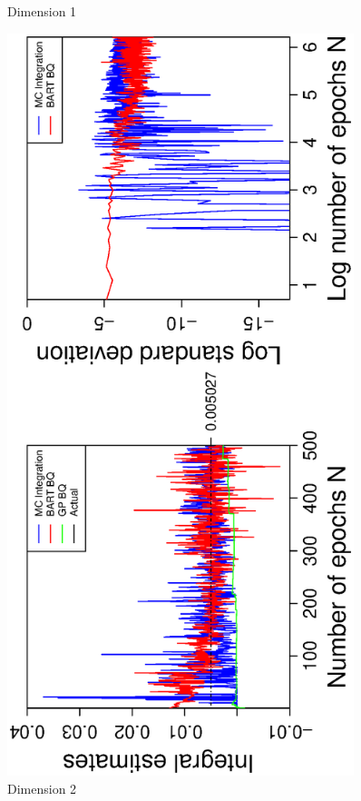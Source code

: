 \begin{figure}[H]
\begin{minipage}[b]{0.4\textwidth}
     \vspace{-1cm}
     \caption{Dimension 1}
  \end{minipage}
    \hspace{1.5cm}
  \begin{minipage}[b]{0.4\textwidth}
    \includegraphics[width= 0.9\textwidth, angle = -90]{report/Figures/4/convergenceMean42Dimensions.eps}
    \vspace{-1cm}
    \caption{Dimension 2}
  \end{minipage}
\end{figure}
\vspace{-1cm}

